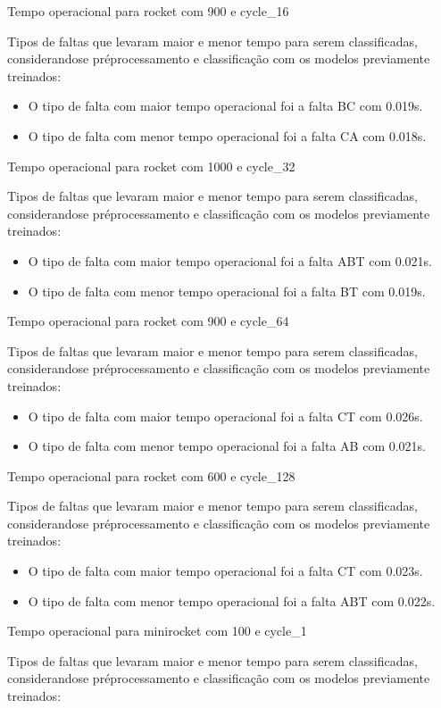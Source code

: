 Tempo operacional para rocket com 900 e cycle_16
\item Tipos de faltas que levaram maior e menor tempo para serem classificadas, considerando\hyph se pré\hyph processamento e classificação com os modelos previamente treinados:
\begin{itemize}
\item O tipo de falta com maior tempo operacional foi a falta BC com 0.019s.
\item O tipo de falta com menor tempo operacional foi a falta CA com 0.018s.
\end{itemize}
Tempo operacional para rocket com 1000 e cycle_32
\item Tipos de faltas que levaram maior e menor tempo para serem classificadas, considerando\hyph se pré\hyph processamento e classificação com os modelos previamente treinados:
\begin{itemize}
\item O tipo de falta com maior tempo operacional foi a falta ABT com 0.021s.
\item O tipo de falta com menor tempo operacional foi a falta BT com 0.019s.
\end{itemize}
Tempo operacional para rocket com 900 e cycle_64
\item Tipos de faltas que levaram maior e menor tempo para serem classificadas, considerando\hyph se pré\hyph processamento e classificação com os modelos previamente treinados:
\begin{itemize}
\item O tipo de falta com maior tempo operacional foi a falta CT com 0.026s.
\item O tipo de falta com menor tempo operacional foi a falta AB com 0.021s.
\end{itemize}
Tempo operacional para rocket com 600 e cycle_128
\item Tipos de faltas que levaram maior e menor tempo para serem classificadas, considerando\hyph se pré\hyph processamento e classificação com os modelos previamente treinados:
\begin{itemize}
\item O tipo de falta com maior tempo operacional foi a falta CT com 0.023s.
\item O tipo de falta com menor tempo operacional foi a falta ABT com 0.022s.
\end{itemize}
Tempo operacional para minirocket com 100 e cycle_1
\item Tipos de faltas que levaram maior e menor tempo para serem classificadas, considerando\hyph se pré\hyph processamento e classificação com os modelos previamente treinados:
